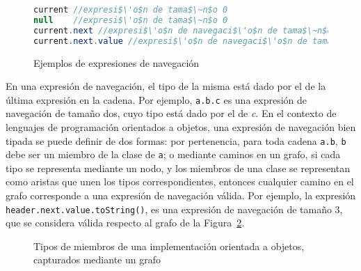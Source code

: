 \begin{figure}
	\begin{lstlisting}[mathescape=true, language=Java, extendedchars=true,basicstyle={}]
current //expresi$\'o$n de tama$\~n$o 0
null 	//expresi$\'o$n de tama$\~n$o 0
current.next //expresi$\'o$n de navegaci$\'o$n de tama$\~n$o 1
current.next.value //expresi$\'o$n de navegaci$\'o$n de tama$\~n$o 2
	\end{lstlisting}
	\caption{Ejemplos de expresiones de navegaci\'on}
	\label{figures.examples.chainedExpr}
\end{figure}

En una expresi\'on de navegaci\'on, el tipo de la misma est\'a dado por el de la \'ultima expresi\'on en la cadena. Por ejemplo, \lstinline|a.b.c| es una expresi\'on de navegaci\'on de tama\~no dos, cuyo tipo est\'a dado por el de \emph{c}. En el contexto de lenguajes de programaci\'on orientados a objetos, una expresi\'on de navegaci\'on bien tipada se puede definir de dos formas: por pertenencia, para toda cadena \texttt{a.b}, \texttt{b} debe ser un miembro de la clase de \texttt{a}; o mediante caminos en un grafo, si cada tipo se representa mediante un nodo, y los miembros de una clase se representan como aristas que unen los tipos correspondientes, entonces cualquier camino en el grafo corresponde a una expresi\'on de navegaci\'on v\'alida. Por ejemplo, la expresi\'on \lstinline|header.next.value.toString()|, es una expresi\'on de navegaci\'on de tama\~no 3, que se considera v\'alida respecto al grafo de la Figura~\ref{figures.examples.navigationExprGraph}.

\begin{figure}
	\begin{center}
		\usetikzlibrary{positioning}
	\end{center}
	\caption{Tipos de miembros de una implementaci\'on orientada a objetos, capturados mediante un grafo}
	\label{figures.examples.navigationExprGraph}
\end{figure}

